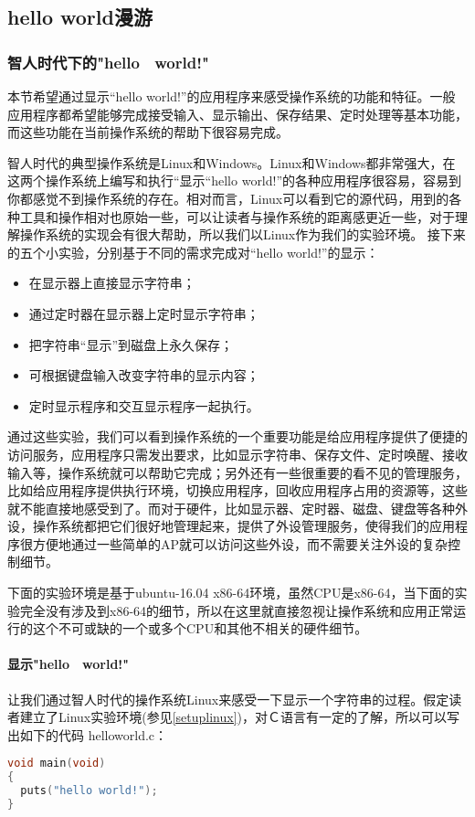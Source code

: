 \subsection{hello world漫游}

\subsubsection{智人时代下的"hello　world!"}

本节希望通过显示“hello world!”的应用程序来感受操作系统的功能和特征。一般应用程序都希望能够完成接受输入、显示输出、保存结果、定时处理等基本功能，而这些功能在当前操作系统的帮助下很容易完成。

智人时代的典型操作系统是Linux和Windows。Linux和Windows都非常强大，在这两个操作系统上编写和执行“显示“hello world!”的各种应用程序很容易，容易到你都感觉不到操作系统的存在。相对而言，Linux可以看到它的源代码，用到的各种工具和操作相对也原始一些，可以让读者与操作系统的距离感更近一些，对于理解操作系统的实现会有很大帮助，所以我们以Linux作为我们的实验环境。
接下来的五个小实验，分别基于不同的需求完成对“hello world!”的显示：
\begin{itemize}
	\item 在显示器上直接显示字符串；
	\item 通过定时器在显示器上定时显示字符串；
	\item 把字符串“显示”到磁盘上永久保存；
	\item 可根据键盘输入改变字符串的显示内容；
	\item 定时显示程序和交互显示程序一起执行。
\end{itemize}

通过这些实验，我们可以看到操作系统的一个重要功能是给应用程序提供了便捷的访问服务，应用程序只需发出要求，比如显示字符串、保存文件、定时唤醒、接收输入等，操作系统就可以帮助它完成；另外还有一些很重要的看不见的管理服务，比如给应用程序提供执行环境，切换应用程序，回收应用程序占用的资源等，这些就不能直接地感受到了。而对于硬件，比如显示器、定时器、磁盘、键盘等各种外设，操作系统都把它们很好地管理起来，提供了外设管理服务，使得我们的应用程序很方便地通过一些简单的AP就可以访问这些外设，而不需要关注外设的复杂控制细节。


\begin{note} 
下面的实验环境是基于ubuntu-16.04 x86-64环境，虽然CPU是x86-64，当下面的实验完全没有涉及到x86-64的细节，所以在这里就直接忽视让操作系统和应用正常运行的这个不可或缺的一个或多个CPU和其他不相关的硬件细节。
\end{note}

\paragraph{显示"hello　world!"}
让我们通过智人时代的操作系统Linux来感受一下显示一个字符串的过程。假定读者建立了Linux实验环境(参见\ref{setuplinux})，对Ｃ语言有一定的了解，所以可以写出如下的代码 helloworld.c：
\begin{lstlisting}[language={C}]
void main(void)
{
  puts("hello world!");
}
\end{lstlisting}

